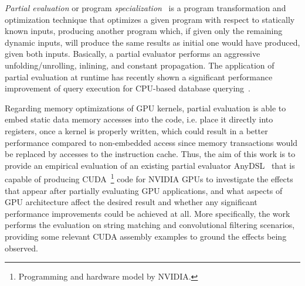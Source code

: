 \textit{Partial evaluation} or program \textit{specialization}~\cite{Jones1993,PartialEvalPaper} is a program
 transformation and optimization technique that optimizes a given program with
  respect to statically known inputs, producing another program which,
   if given only the remaining dynamic inputs, will produce the same results
    as initial one would have produced, given both inputs.
Basically, a partial evaluator performs an aggressive unfolding/unrolling, 
inlining, and constant propagation.  
The application of partial evaluation at runtime has 
recently shown a significant performance improvement of query execution for CPU-based
 database querying~\cite{LLVMmix}. 

Regarding memory optimizations of GPU kernels, partial evaluation is 
able to embed static data memory accesses into the code, i.e. place it directly 
into registers, once a kernel is properly written, which could result in a better
 performance compared to non-embedded access since memory transactions would be replaced 
 by accesses to the instruction cache. Thus, the aim of this work is to provide 
 an empirical evaluation of an existing partial evaluator AnyDSL~\cite{LeiBa} 
 that is capable of producing CUDA~\footnote{Programming and hardware model by NVIDIA.} code for NVIDIA GPUs
  to investigate the effects that appear after partially evaluating GPU applications,
   and what aspects of GPU architecture affect the desired result and 
   whether any significant performance improvements could be achieved at all.
   More specifically, the work performs the evaluation on string matching and convolutional filtering scenarios, providing some relevant CUDA assembly examples to ground the effects being observed.

